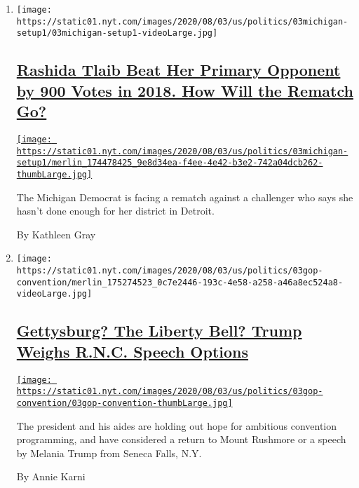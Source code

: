 \begin{enumerate}
\def\labelenumi{\arabic{enumi}.}
\item
  \texttt{[image: https://static01.nyt.com/images/2020/08/03/us/politics/03michigan-setup1/03michigan-setup1-videoLarge.jpg]}

  \hypertarget{rashida-tlaib-beat-her-primary-opponent-by-900-votes-in-2018-how-will-the-rematch-go}{%
  \subsection{\texorpdfstring{\href{/2020/08/03/us/politics/michigan-primary-rashida-tlaib-brenda-jones.html}{Rashida
  Tlaib Beat Her Primary Opponent by 900 Votes in 2018. How Will the
  Rematch
  Go?}}{Rashida Tlaib Beat Her Primary Opponent by 900 Votes in 2018. How Will the Rematch Go?}}\label{rashida-tlaib-beat-her-primary-opponent-by-900-votes-in-2018-how-will-the-rematch-go}}

  \href{/2020/08/03/us/politics/michigan-primary-rashida-tlaib-brenda-jones.html}{\texttt{[image: https://static01.nyt.com/images/2020/08/03/us/politics/03michigan-setup1/merlin\_174478425\_9e8d34ea-f4ee-4e42-b3e2-742a04dcb262-thumbLarge.jpg]}}

  The Michigan Democrat is facing a rematch against a challenger who
  says she hasn't done enough for her district in Detroit.

  By Kathleen Gray
\item
  \texttt{[image: https://static01.nyt.com/images/2020/08/03/us/politics/03gop-convention/merlin\_175274523\_0c7e2446-193c-4e58-a258-a46a8ec524a8-videoLarge.jpg]}

  \hypertarget{gettysburg-the-liberty-bell-trump-weighs-rnc-speech-options}{%
  \subsection{\texorpdfstring{\href{/2020/08/03/us/politics/trump-rnc-speech.html}{Gettysburg?
  The Liberty Bell? Trump Weighs R.N.C. Speech
  Options}}{Gettysburg? The Liberty Bell? Trump Weighs R.N.C. Speech Options}}\label{gettysburg-the-liberty-bell-trump-weighs-rnc-speech-options}}

  \href{/2020/08/03/us/politics/trump-rnc-speech.html}{\texttt{[image: https://static01.nyt.com/images/2020/08/03/us/politics/03gop-convention/03gop-convention-thumbLarge.jpg]}}

  The president and his aides are holding out hope for ambitious
  convention programming, and have considered a return to Mount Rushmore
  or a speech by Melania Trump from Seneca Falls, N.Y.

  By Annie Karni
\end{enumerate}

